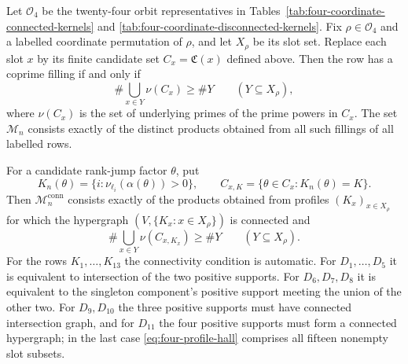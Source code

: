\begin{theorem}
\label{thm:four-coordinate-arithmetic-realization}
Let $\mathcal O_4$ be the twenty-four orbit representatives in
Tables~\ref{tab:four-coordinate-connected-kernels} and
\ref{tab:four-coordinate-disconnected-kernels}.  Fix
$\rho\in\mathcal O_4$ and a labelled coordinate permutation of $\rho$, and
let $X_\rho$ be its slot set.  Replace each slot $x$ by its finite candidate
set $C_x=\mathfrak C(x)$ defined above.
Then the row has a coprime filling if and only if
\begin{equation}\label{eq:four-hall}
 \#\bigcup_{x\in Y}\nu(C_x)\ge\#Y
 \qquad(Y\subseteq X_\rho),
\end{equation}
where $\nu(C_x)$ is the set of underlying primes of the prime powers in
$C_x$.  The set $\mathcal M_n$ consists exactly of the distinct products
obtained from all such fillings of all labelled rows.

For a candidate rank-jump factor $\theta$, put
\[
 K_n(\theta)=\{i:\nu_{\ell_i}(\alpha(\theta))>0\},
 \qquad
 C_{x,K}=\{\theta\in C_x:K_n(\theta)=K\}.
\]
Then $\mathcal M_n^{\mathrm{conn}}$ consists exactly of the products obtained
from profiles $(K_x)_{x\in X_\rho}$ for which the hypergraph
$(V,\{K_x:x\in X_\rho\})$ is connected and
\begin{equation}\label{eq:four-profile-hall}
 \#\bigcup_{x\in Y}\nu(C_{x,K_x})\ge\#Y
 \qquad(Y\subseteq X_\rho).
\end{equation}
For the rows $K_1,\ldots,K_{13}$ the connectivity condition is automatic.
For $D_1,\ldots,D_5$ it is equivalent to intersection of the two positive
supports.  For $D_6,D_7,D_8$ it is equivalent to the singleton component's
positive support meeting the union of the other two.  For $D_9,D_{10}$ the
three positive supports must have connected intersection graph, and for
$D_{11}$ the four positive supports must form a connected hypergraph; in the
last case \eqref{eq:four-profile-hall} comprises all fifteen nonempty slot
subsets.
\end{theorem}


